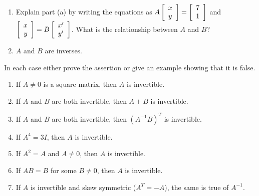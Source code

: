 \begin{multicols}{2}
\begin{ex}
\begin{enumerate}[label={\alph*.}]
\item Explain part (a) by writing the equations as $A \left[ \begin{array}{c}
x \\
y
\end{array} \right] = \left[ \begin{array}{r}
7 \\
1
\end{array} \right]$
 and $\left[ \begin{array}{r}
 x \\
 y
 \end{array} \right] = B \left[ \begin{array}{c}
 x^\prime \\
 y^\prime
 \end{array} \right]$. What is the relationship between $A$ and $B$?

\end{enumerate}
\begin{sol}
\begin{enumerate}[label={\alph*.}]
\setcounter{enumi}{1}
\item  $A$ and $B$ are inverses.

\end{enumerate}
\end{sol}
\end{ex}

\begin{ex}
In each case either prove the assertion or give an example showing that it is false.

\begin{enumerate}[label={\alph*.}]
\item If $A \neq 0$ is a square matrix, then $A$ is invertible.

\item If $A$ and $B$ are both invertible, then $A + B$ is invertible.

\item If $A$ and $B$ are both invertible, then $(A^{-1}B)^{T}$ is invertible.

\item If $A^{4} = 3I$, then $A$ is invertible.

\item If $A^{2} = A$ and $A \neq 0$, then $A$ is invertible.

\item If $AB = B$ for some $B \neq 0$, then $A$ is invertible.

\item If $A$ is invertible and skew symmetric ($A^{T} = -A$), the same is true of $A^{-1}$.


\end{enumerate}
\end{ex}
\end{multicols}
